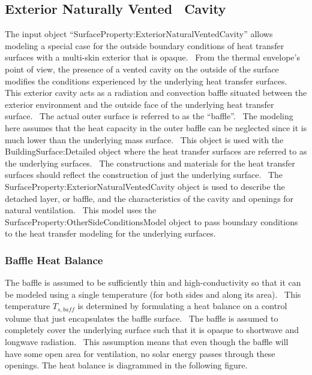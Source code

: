 \subsection{Exterior Naturally Vented~ Cavity}\label{exterior-naturally-vented-cavity}

The input object ``SurfaceProperty:ExteriorNaturalVentedCavity'' allows modeling a special case for the outside boundary conditions of heat transfer surfaces with a multi-skin exterior that is opaque.~ From the thermal envelope's point of view, the presence of a vented cavity on the outside of the surface modifies the conditions experienced by the underlying heat transfer surfaces.~ This exterior cavity acts as a radiation and convection baffle situated between the exterior environment and the outside face of the underlying heat transfer surface.~ The actual outer surface is referred to as the ``baffle''.~ The modeling here assumes that the heat capacity in the outer baffle can be neglected since it is much lower than the underlying mass surface.~ This object is used with the BuildingSurface:Detailed object where the heat transfer surfaces are referred to as the underlying surfaces.~ The constructions and materials for the heat transfer surfaces should reflect the construction of just the underlying surface.~ The SurfaceProperty:ExteriorNaturalVentedCavity object is used to describe the detached layer, or baffle, and the characteristics of the cavity and openings for natural ventilation.~ This model uses the SurfaceProperty:OtherSideConditionsModel object to pass boundary conditions to the heat transfer modeling for the underlying surfaces.

\subsubsection{Baffle Heat Balance}\label{baffle-heat-balance}

The baffle is assumed to be sufficiently thin and high-conductivity so that it can be modeled using a single temperature (for both sides and along its area).~ This temperature \({T_{s,baff}}\) is determined by formulating a heat balance on a control volume that just encapsulates the baffle surface.~ The baffle is assumed to completely cover the underlying surface such that it is opaque to shortwave and longwave radiation.~ This assumption means that even though the baffle will have some open area for ventilation, no solar energy passes through these openings. The heat balance is diagrammed in the following figure.

